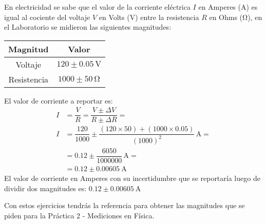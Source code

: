 \documentclass[14pt]{extarticle}
\begin{document}
\vspace*{0.5cm}
\noindent
En electricidad se sabe que el valor de la corriente eléctrica $I$ en Amperes (\unit{\ampere}) es igual al cociente del voltaje $V$ en Volts (\unit{\volt}) entre la resistencia $R$ en Ohms (\unit{\ohm}), en el Laboratorio se midieron las siguientes magnitudes:
\begin{table}[H]
\centering
\begin{tabular}{| c | c |} \hline
    Magnitud & Valor \\ \hline
    Voltaje & $\num{120} \pm \num{0.05} \, \unit{\volt}$ \\ \hline
    Resistencia & $\num{1000} \pm \num{50} \, \unit{\ohm}$ \\ \hline
\end{tabular}
\end{table}
El valor de corriente a reportar es:
\begin{align*}
I &= \dfrac{V}{R} = \dfrac{V \pm \Delta V}{R \pm \Delta R} = \\[0.5em]
I &= \dfrac{\num{120}}{\num{1000}} \pm \dfrac{(\num{120} \times \num{50}) + (\num{1000} \times \num{0.05})}{(\num{1000})^{2}} \, \unit{\ampere}= \\[0.5em]
&= \num{0.12} \pm \dfrac{6050}{1000000} \, \unit{\ampere}= \\[0.5em]
&= \num{0.12} \pm \SI{0.00605}{\ampere}
\end{align*}
El valor de corriente en Amperes con su incertidumbre que se reportaría luego de dividir dos magnitudes es: $\num{0.12} \pm \SI{0.00605}{\ampere}$

\vspace*{1cm}
Con estos ejercicios tendrás la referencia para obtener las magnitudes que se piden para la Práctica 2 - Mediciones en Física.
\end{document}
